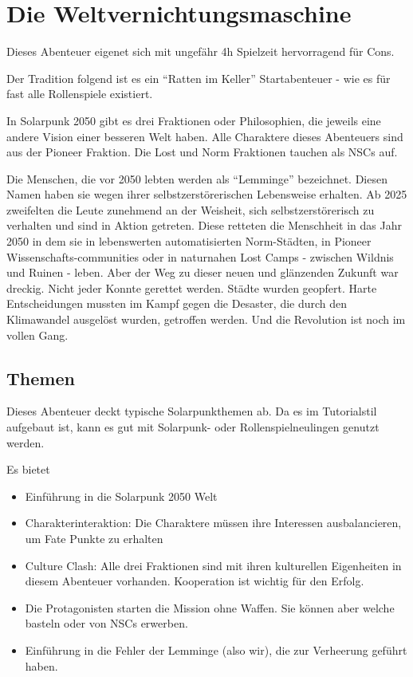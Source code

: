 \chapter{Die Weltvernichtungsmaschine}
\label{ch:the world destroying machine}

Dieses Abenteuer eigenet sich mit ungefähr 4h Spielzeit hervorragend für Cons.

Der Tradition folgend ist es ein \enquote{Ratten im Keller} Startabenteuer - wie es für fast alle Rollenspiele existiert.

In Solarpunk 2050 gibt es drei Fraktionen oder Philosophien, die jeweils eine andere Vision einer besseren Welt haben.
Alle Charaktere dieses Abenteuers sind aus der Pioneer Fraktion. Die Lost und Norm Fraktionen tauchen als NSCs auf.

\begin{sidebarBox}[title=Der dreckige Weg nach Eden]

Die Menschen, die vor 2050 lebten werden als \enquote{Lemminge} bezeichnet. Diesen Namen haben sie wegen ihrer selbstzerstörerischen Lebensweise erhalten. Ab 2025 zweifelten die Leute zunehmend an der Weisheit, sich selbstzerstörerisch zu verhalten und sind in Aktion getreten. Diese retteten die Menschheit in das Jahr 2050 in dem sie in lebenswerten automatisierten Norm-Städten, in Pioneer Wissenschafts-communities oder in naturnahen Lost Camps - zwischen Wildnis und Ruinen - leben.
Aber der Weg zu dieser neuen und glänzenden Zukunft war dreckig. Nicht jeder Konnte gerettet werden. Städte wurden geopfert. Harte Entscheidungen mussten im Kampf gegen die Desaster, die durch den Klimawandel ausgelöst wurden, getroffen werden.
Und die Revolution ist noch im vollen Gang.

\end{sidebarBox}

\section{Themen}

Dieses Abenteuer deckt typische Solarpunkthemen ab. Da es im Tutorialstil aufgebaut ist, kann es gut mit Solarpunk- oder Rollenspielneulingen genutzt werden.

Es bietet

\begin{itemize}
\item Einführung in die Solarpunk 2050 Welt
\item Charakterinteraktion: Die Charaktere müssen ihre Interessen ausbalancieren, um Fate Punkte zu erhalten
\item Culture Clash: Alle drei Fraktionen sind mit ihren kulturellen Eigenheiten in diesem Abenteuer vorhanden. Kooperation ist wichtig für den Erfolg.
\item Die Protagonisten starten die Mission ohne Waffen. Sie können aber welche basteln oder von NSCs erwerben.
\item Einführung in die Fehler der Lemminge (also wir), die zur Verheerung geführt haben.
\end{itemize}

